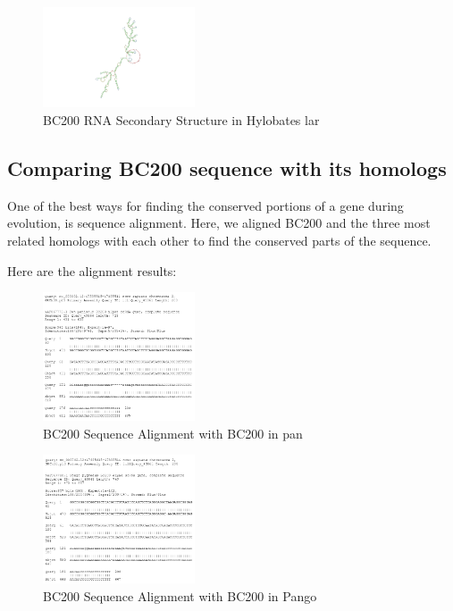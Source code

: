 \documentclass[conference]{IEEEtran}
\begin{document}
\begin{figure}[h]
  \centering
  \includegraphics[width=0.4\textwidth]{figs/rna.png}
  \caption{BC200 RNA Secondary Structure in Hylobates lar}
  \label{fig:hylobates-structure}
\end{figure}

\subsection{Comparing BC200 sequence with its homologs}

One of the best ways for finding the conserved portions of a gene during evolution, is sequence alignment. Here, we aligned BC200 and the three most related homologs with each other to find the conserved parts of the sequence.

Here are the alignment results:

\begin{figure}
  \centering
  \includegraphics[width=0.4\textwidth]{figs/TK1PBYHT114-Alignment-2-page-1.png}
  \caption{BC200 Sequence Alignment with BC200 in pan}
\end{figure}

\begin{figure}
  \centering
  \includegraphics[width=0.4\textwidth]{figs/TK1PBYHT114-Alignment-3-page-1.png}
  \caption{BC200 Sequence Alignment with BC200 in Pango}
\end{figure}
\end{document}
